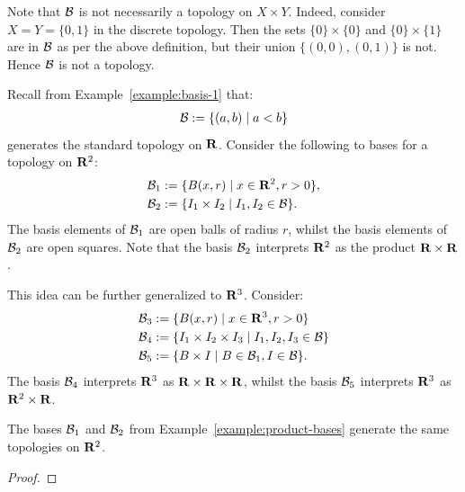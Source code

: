 \begin{remark}
    Note that $\mathcal{B}$ is not necessarily a topology on $X \times Y$. Indeed, 
    consider $X = Y = \{0,1\}$ in the discrete topology. Then the sets $\{0\}\times\{0\}$ and $\{0\}\times\{1\}$ are in $\mathcal{B}$ as per the above definition, but their union $\{(0,0),(0,1)\}$ is not. Hence $\mathcal{B}$ is not a topology.
\end{remark}

\begin{example}\label{example:product-bases}
    Recall from Example~\ref{example:basis-1} that:
        \begin{equation*}
        \begin{split}
            \mathcal{B} := \{(a,b) \mid a < b\}
        \end{split}
        \end{equation*} 
    generates the standard topology on $\mathbf{R}$. Consider the following to bases for a topology on $\mathbf{R}^2$:
        \begin{equation*}
        \begin{split}
            \mathcal{B}_1 &:= \{B(x,r) \mid x \in \mathbf{R}^2, r > 0\}, \\
            \mathcal{B}_2 &:= \{I_1 \times I_2 \mid I_1, I_2 \in \mathcal{B}\}.
        \end{split}
        \end{equation*}
    The basis elements of $\mathcal{B}_1$ are open balls of radius $r$, whilst the basis elements of $\mathcal{B}_2$ are open squares. Note that the basis $\mathcal{B}_2$ interprets $\mathbf{R}^2$ as the product $\mathbf{R} \times \mathbf{R}$.

    This idea can be further generalized to $\mathbf{R}^3$. Consider:
        \begin{equation*}
        \begin{split}
            \mathcal{B}_3 &:= \{B(x,r) \mid x \in \mathbf{R}^3 , r > 0\} \\
            \mathcal{B}_4 &:= \{I_1 \times I_2 \times I_3 \mid I_1,I_2,I_3 \in \mathcal{B}\} \\
            \mathcal{B}_5 &:= \{ B \times I \mid B \in \mathcal{B}_1, I \in \mathcal{B}\}.
        \end{split}
        \end{equation*}
    The basis $\mathcal{B}_4$ interprets $\mathbf{R}^3$ as $\mathbf{R} \times \mathbf{R} \times \mathbf{R}$, whilst the basis $\mathcal{B}_5$ interprets $\mathbf{R}^3$ as $\mathbf{R}^2 \times \mathbf{R}$.
\end{example}

\begin{proposition}
    The bases $\mathcal{B}_1$ and $\mathcal{B}_2$ from Example~\ref{example:product-bases} generate the same topologies on $\mathbf{R}^2$.
\end{proposition}
    {\color{red} \begin{proof}
        
    \end{proof}}

